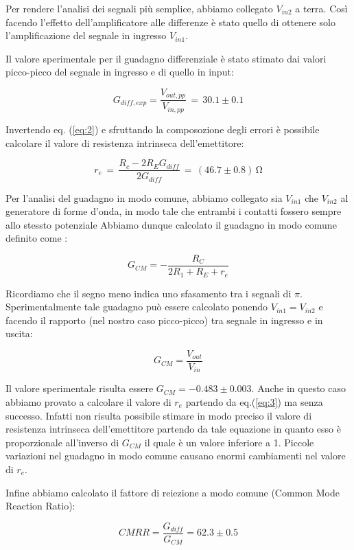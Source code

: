 \noindent Per rendere l'analisi dei segnali più semplice, abbiamo collegato $V_{in2}$ a terra.
Così facendo l'effetto dell'amplificatore alle differenze è stato quello di ottenere solo l'amplificazione del segnale in ingresso $V_{in1}$. 

Il valore sperimentale per il guadagno differenziale è stato stimato dai valori picco-picco del segnale in ingresso e di quello in input:

$$G_{diff,exp}=\frac{V_{out,pp}}{V_{in,pp}} \, = \, 30.1 \pm 0.1$$

Invertendo eq. (\ref{eq:2}) e sfruttando la composozione degli errori è possibile calcolare il valore di resistenza intrinseca dell'emettitore:

$$ r_e \, = \, \frac{R_c-2R_E G_{diff}}{2G_{diff}} \, = \, (46.7\pm0.8) \, \si{\ohm}$$

\noindent Per l'analisi del guadagno in modo comune, abbiamo collegato sia $V_{in1}$ che $V_{in2}$ al generatore di forme d'onda, in modo tale che entrambi i contatti fossero sempre allo stessto potenziale
Abbiamo dunque calcolato il guadagno in modo comune definito come :

\begin{equation}
G_{CM}=-\frac{R_C}{2R_1+R_E+	r_e}
\label{eq:3}
\end{equation}

Ricordiamo che il segno meno indica uno sfasamento tra i segnali di $\pi$.
Sperimentalmente tale guadagno può essere calcolato ponendo $V_{in1}=V_{in2}$ e facendo il rapporto (nel nostro caso picco-picco) tra segnale in ingresso e in uscita:

$$G_{CM}=\frac{V_{out}}{V_{in}}$$

Il valore sperimentale risulta essere $G_{CM} = -0.483 \pm 0.003$. Anche in questo caso abbiamo provato a calcolare il valore di $r_e$ partendo da eq.(\ref{eq:3}) ma senza successo.
Infatti non risulta possibile stimare in modo preciso il valore di resistenza intrinseca dell'emettitore partendo da tale equazione in quanto esso è proporzionale all'inverso di $G_{CM}$ il quale è un valore inferiore a 1.
Piccole variazioni nel guadagno in modo comune causano enormi cambiamenti nel valore di $r_e$. 

Infine abbiamo calcolato il fattore di reiezione a modo comune (Common Mode Reaction Ratio):

\begin{equation}
CMRR=\frac{G_{diff}}{G_{CM}}=62.3\pm0.5
\end{equation}

